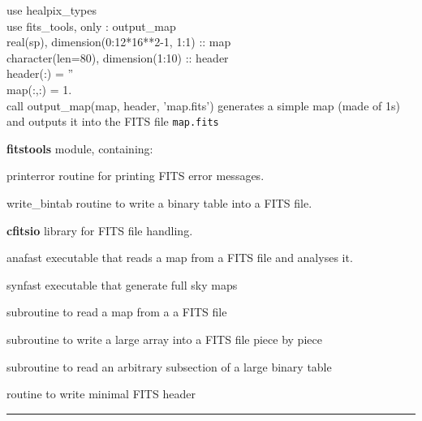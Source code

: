 \begin{example}
{
use healpix\_types \\
use fits\_tools, only : output\_map \\
real(sp), dimension(0:12*16**2-1, 1:1) :: map \\
character(len=80), dimension(1:10) :: header \\
header(:) = '' \\
map(:,:) = 1. \\
call output\_map(map, header, 'map.fits')
}
{generates a simple map (made of 1s) and outputs it into the FITS file {\tt map.fits}
}
\end{example}
\newpage
\begin{modules}
  \begin{sulist}{} %
  \item[\textbf{fitstools}] module, containing:
  \item[printerror] routine for printing FITS error messages.
  \item[write\_bintab] routine to write a binary table into a FITS file.
  \item[\textbf{cfitsio}] library for FITS file handling.		
  \end{sulist}
\end{modules}

\begin{related}
  \begin{sulist}{} %
  \item[anafast] executable that reads a \healpix map from a FITS file
  and analyses it. 
  \item[synfast] executable that generate full sky \healpix maps
  \item[\htmlref{input\_map}{sub:input_map}] subroutine to read a \healpix map from a a FITS file
  \item[\htmlref{write\_bintabh}{sub:write_bintabh}] subroutine to write a large
  array into a FITS file piece by piece
  \item[\htmlref{input\_tod*}{sub:input_tod}] subroutine to read an arbitrary subsection of
  a large binary table
  \item[\htmlref{write\_minimal\_header}{sub:write_minimal_header}] routine to
write minimal FITS header
  \end{sulist}
\end{related}

\rule{\hsize}{2mm}

\newpage
